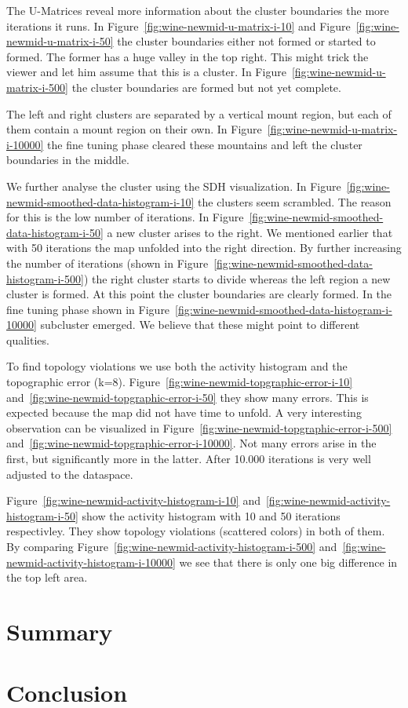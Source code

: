 \documentclass{acm_proc_article-sp}
\begin{document}
The U-Matrices reveal more information about the cluster boundaries the more iterations it runs.
In Figure~\ref{fig:wine-newmid-u-matrix-i-10} and 
Figure~\ref{fig:wine-newmid-u-matrix-i-50} the cluster boundaries either not formed or started to formed. The
former has a huge valley in the top right. This might trick the viewer and let him assume that this is a cluster.
In Figure~\ref{fig:wine-newmid-u-matrix-i-500} the cluster boundaries are formed but not yet complete.

The left and right clusters are separated by a vertical mount region, but each of them contain a
mount region on their own. In Figure~\ref{fig:wine-newmid-u-matrix-i-10000} the fine tuning phase cleared these mountains and
left the cluster boundaries in the middle.

We further analyse the cluster using the SDH visualization. In Figure~\ref{fig:wine-newmid-smoothed-data-histogram-i-10} the
clusters seem scrambled. The reason for this is the low number of iterations.
In Figure~\ref{fig:wine-newmid-smoothed-data-histogram-i-50} a new cluster arises to the right. We mentioned earlier that 
with 50 iterations the map unfolded into the right direction. By further increasing the number of iterations
(shown in Figure~\ref{fig:wine-newmid-smoothed-data-histogram-i-500}) the right cluster starts to divide whereas the left region
a new cluster is formed. At this point the cluster boundaries are clearly formed. In the fine tuning phase
shown in Figure~\ref{fig:wine-newmid-smoothed-data-histogram-i-10000} subcluster emerged. We believe that these might point to different
qualities.

To find topology violations we use both the activity histogram and the topographic error (k=8).
Figure~\ref{fig:wine-newmid-topgraphic-error-i-10} and~\ref{fig:wine-newmid-topgraphic-error-i-50} they show many errors.
This is expected because the map did not have time to unfold. A very interesting observation can be
visualized in Figure~\ref{fig:wine-newmid-topgraphic-error-i-500} and~\ref{fig:wine-newmid-topgraphic-error-i-10000}.
Not many errors arise in the first, but significantly more in the latter. After 10.000 iterations is very well adjusted to
the dataspace.

Figure~\ref{fig:wine-newmid-activity-histogram-i-10} and~\ref{fig:wine-newmid-activity-histogram-i-50} show the activity
histogram with 10 and 50 iterations respectivley. They show topology violations (scattered colors) in both of them.
By comparing Figure~\ref{fig:wine-newmid-activity-histogram-i-500} and~\ref{fig:wine-newmid-activity-histogram-i-10000} 
we see that there is only one big difference in the top left area.


\section{Summary}

\section{Conclusion}




\end{document}
